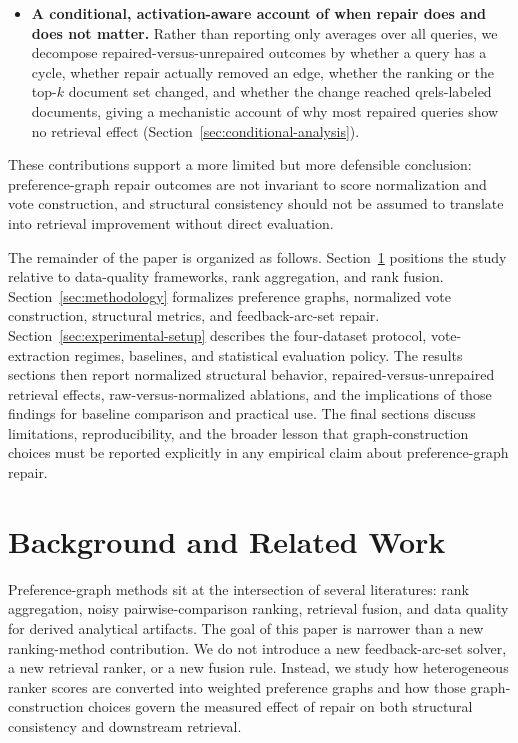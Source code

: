 \documentclass[manuscript,anonymous,review]{acmart}
\begin{document}
\begin{itemize}
    (Section~\ref{sec:threshold-protocols}), four independently-constructed
    candidate pools (Section~\ref{sec:pool-robustness}), and four additional
    graph-ranking baselines (Section~\ref{sec:baselines}).
  \item \textbf{A conditional, activation-aware account of when repair does
    and does not matter.} Rather than reporting only averages over all
    queries, we decompose repaired-versus-unrepaired outcomes by whether a
    query has a cycle, whether repair actually removed an edge, whether the
    ranking or the top-$k$ document set changed, and whether the change
    reached qrels-labeled documents, giving a mechanistic account of why most
    repaired queries show no retrieval effect
    (Section~\ref{sec:conditional-analysis}).
\end{itemize}

These contributions support a more limited but more defensible conclusion:
preference-graph repair outcomes are not invariant to score normalization and
vote construction, and structural consistency should not be assumed to
translate into retrieval improvement without direct evaluation.

The remainder of the paper is organized as follows. Section~\ref{sec:background} positions the
study relative to data-quality frameworks, rank aggregation, and rank fusion.
Section~\ref{sec:methodology} formalizes preference graphs, normalized vote construction,
structural metrics, and feedback-arc-set repair. Section~\ref{sec:experimental-setup} describes the
four-dataset protocol, vote-extraction regimes, baselines, and statistical
evaluation policy. The results sections then report normalized structural
behavior, repaired-versus-unrepaired retrieval effects, raw-versus-normalized
ablations, and the implications of those findings for baseline comparison and
practical use. The final sections discuss limitations, reproducibility, and
the broader lesson that graph-construction choices must be reported
explicitly in any empirical claim about preference-graph repair.

\section{Background and Related Work}
\label{sec:background}

Preference-graph methods sit at the intersection of several literatures:
rank aggregation, noisy pairwise-comparison ranking, retrieval fusion, and
data quality for derived analytical artifacts. The goal of this paper
is narrower than a new ranking-method contribution. We do not introduce a new
feedback-arc-set solver, a new retrieval ranker, or a new fusion rule.
Instead, we study how heterogeneous ranker scores are converted into weighted
preference graphs and how those graph-construction choices govern the measured
effect of repair on both structural consistency and downstream retrieval.
\end{document}
